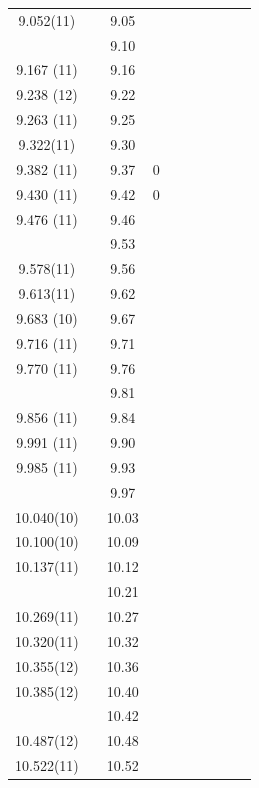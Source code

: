 {\begin{landscape}
\begin{center}
\begin{longtable}{cc cc cc cc cc}
   9.052(11)  	&		&	9.05	&		&		&		&		&		&		&		\\
	&		&	9.10	&		&		&		&		&		&		&		\\
  9.167 (11)  	&		&	9.16	&		&		&		&		&		&		&		\\
  9.238 (12)  	&		&	9.22	&		&		&		&		&		&		&		\\
  9.263 (11)  	&		&	9.25	&		&		&		&		&		&		&		\\
   9.322(11)  	&		&	9.30	&		&		&		&		&		&		&		\\
  9.382 (11)  	&		&	9.37	&	0	&		&		&		&		&		&		\\
  9.430 (11)  	&		&	9.42	&	0	&		&		&		&		&		&		\\
  9.476 (11)  	&		&	9.46	&		&		&		&		&		&		&		\\
	&		&	9.53	&		&		&		&		&		&		&		\\
   9.578(11)  	&		&	9.56	&		&		&		&		&		&		&		\\
   9.613(11)  	&		&	9.62	&		&		&		&		&		&		&		\\
  9.683 (10)  	&		&	9.67	&		&		&		&		&		&		&		\\
  9.716 (11)  	&		&	9.71	&		&		&		&		&		&		&		\\
  9.770 (11)  	&		&	9.76	&		&		&		&		&		&		&		\\
	&		&	9.81	&		&		&		&		&		&		&		\\
  9.856 (11)  	&		&	9.84	&		&		&		&		&		&		&		\\
  9.991 (11)  	&		&	9.90	&		&		&		&		&		&		&		\\
  9.985 (11)  	&		&	9.93	&		&		&		&		&		&		&		\\
	&		&	9.97	&		&		&		&		&		&		&		\\
  10.040(10)  	&		&	10.03	&		&		&		&		&		&		&		\\
  10.100(10)  	&		&	10.09	&		&		&		&		&		&		&		\\
  10.137(11)  	&		&	10.12	&		&		&		&		&		&		&		\\
	&		&	10.21	&		&		&		&		&		&		&		\\
  10.269(11)  	&		&	10.27	&		&		&		&		&		&		&		\\
  10.320(11)  	&		&	10.32	&		&		&		&		&		&		&		\\
  10.355(12)  	&		&	10.36	&		&		&		&		&		&		&		\\
  10.385(12)  	&		&	10.40	&		&		&		&		&		&		&		\\
	&		&	10.42	&		&		&		&		&		&		&		\\
  10.487(12)  	&		&	10.48	&		&		&		&		&		&		&		\\
  10.522(11)  	&		&	10.52	&		&		&		&		&		&		&		\\

\end{longtable}
\end{center}
\end{landscape}}
